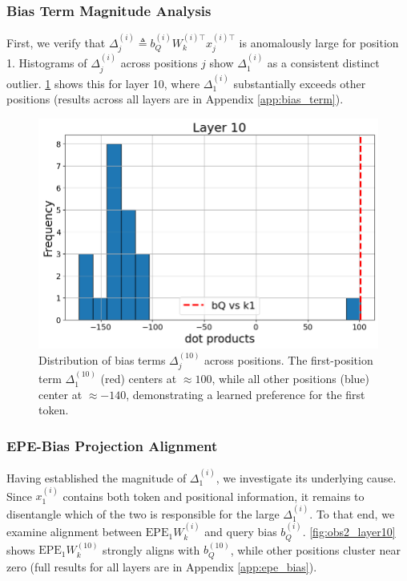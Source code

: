 \documentclass[11pt]{article}
\begin{document}
\subsubsection{Bias Term Magnitude Analysis}
\label{sec:delta_analysis}
First, we verify that $\Delta_j^{(i)} \triangleq b_Q^{(i)}W_k^{(i)\top} x_j^{(i)\top}$ is anomalously large for position 1. Histograms of $\Delta_j^{(i)}$ across positions $j$ show $\Delta_1^{(i)}$ as a consistent distinct outlier. \cref{fig:obs1_layer10} shows this for layer 10, where $\Delta_1^{(i)}$ substantially exceeds other positions (results across all layers are in Appendix \ref{app:bias_term}).

\begin{figure}[t]
  \includegraphics[width=\columnwidth]{figures/obs1_layer10.png}
  \caption{Distribution of bias terms $\Delta_j^{(10)}$ across positions. The first-position term $\Delta_1^{(10)}$ (red) centers at $\approx 100$, while all other positions (blue) center at $\approx -140$, demonstrating a learned preference for the first token.}
  \label{fig:obs1_layer10}
\end{figure}

\subsubsection{EPE-Bias Projection Alignment}
\label{sec:epe_alignment}
Having established the magnitude of $\Delta_1^{(i)}$, we investigate its underlying cause. Since $x_1^{(i)}$ contains both token and positional information, it remains to disentangle which of the two is responsible for the large $\Delta_1^{(i)}$. To that end, we examine alignment between $\mathrm{EPE}_1W_k^{(i)}$ and query bias $b_Q^{(i)}$. \cref{fig:obs2_layer10} shows $\mathrm{EPE}_1W_k^{(10)}$ strongly aligns with $b_Q^{(10)}$, while other positions cluster near zero (full results for all layers are in Appendix \ref{app:epe_bias}).
\end{document}
